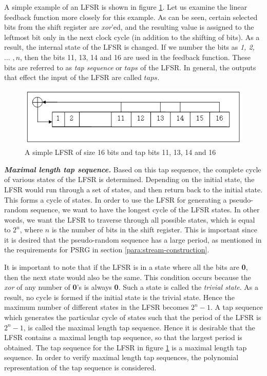 A simple example of an LFSR is shown in figure \ref{fig:lfsr-example1}. Let us examine the linear feedback function more closely for this example. As can be seen, certain selected bits from the shift register are \emph{xor}'ed, and the resulting value is assigned to the leftmost bit only in the next clock cycle (in addition to the shifting of bits). As a result, the internal state of the LFSR is changed. If we number the bits as \emph{1, 2,} $\ldots$ $, n$, then the bits 11, 13, 14 and 16 are used in the feedback function. These bits are referred to as \emph{tap sequence} or $taps$ of the LFSR. In general, the outputs that effect the input of the LFSR are called $taps$.\\


\begin{figure}[ht!]
	\centering
		\includegraphics[width=5in]{./figures/lfsr-example.PNG}
	\caption{A simple LFSR of size 16 bits and tap bits 11, 13, 14 and 16}	
	\label{fig:lfsr-example1}
\end{figure}

\noindent \textit{\textbf{Maximal length tap sequence.}} Based on this tap sequence, the complete cycle of various states of the LFSR is determined. Depending on the initial state, the LFSR would run through a set of states, and then return back to the initial state. This forms a cycle of states. In order to use the LFSR for generating a pseudo-random sequence, we want to have the longest cycle of the LFSR states. In other words, we want the LFSR to traverse through all possible states, which is equal to $2^n$, where $n$ is the number of bits in the shift register. This is important since it is desired that the pseudo-random sequence has a large period, as mentioned in the requirements for PSRG in section \ref{para:stream-construction}.

It is important to note that if the LFSR is in a state where all the bits are \textbf{0}, then the next state would also be the same. This condition occurs because the \textit{xor} of any number of \textbf{0}'s is always \textbf{0}. Such a state is called the \textit{trivial state}. As a result, no cycle is formed if the initial state is the trivial state. Hence the maximum number of different states in the LFSR becomes $2^n-1$. A tap sequence which generates the particular cycle of states such that the period of the LFSR is $2^n-1$, is called the maximal length tap sequence. Hence it is desirable that the LFSR contains a maximal length tap sequence, so that the largest period is obtained. The tap sequence for the LFSR in figure \ref{fig:lfsr-example1} is a maximal length tap sequence. In order to verify maximal length tap sequences, the polynomial representation of the tap sequence is considered.\\

